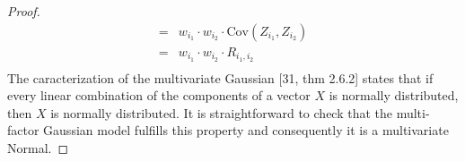 \documentclass[11pt,fleqn]{book} %
\begin{document}
\begin{proof}
\begin{displaymath}
\begin{array}{rl}
			=                                         & w_{i_1} \cdot w_{i_2} \cdot \text{Cov}(Z_{i_1}, Z_{i_2})                                                   \\
			=                                         & w_{i_1} \cdot w_{i_2} \cdot R_{i_1,i_2}                                                                    \\
		\end{array}
	\end{displaymath}
	The caracterization of the multivariate Gaussian [31, thm 2.6.2]
	states that if every linear combination of the components of a 
	vector $X$ is normally distributed, then $X$ is normally distributed.
	It is straightforward to check that the multi-factor Gaussian model 
	fulfills this property and consequently it is a multivariate Normal.
\end{proof}
\end{document}
